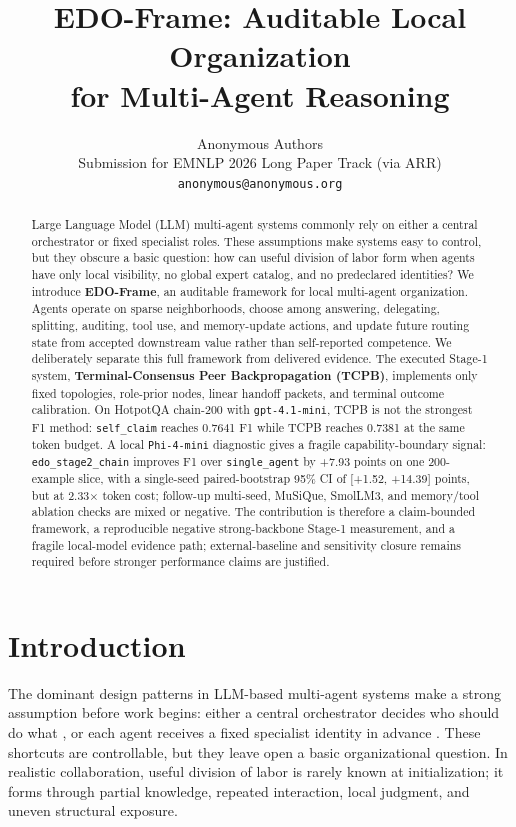 \documentclass[11pt]{article}
\title{EDO-Frame: Auditable Local Organization \\
for Multi-Agent Reasoning}
\author{Anonymous Authors \\
  Submission for EMNLP 2026 Long Paper Track (via ARR) \\
  \texttt{anonymous@anonymous.org}}
\begin{document}
\maketitle
\sloppy

\begin{abstract}
Large Language Model (LLM) multi-agent systems commonly rely on either a central orchestrator or fixed specialist roles. These assumptions make systems easy to control, but they obscure a basic question: how can useful division of labor form when agents have only local visibility, no global expert catalog, and no predeclared identities? We introduce \textbf{EDO-Frame}, an auditable framework for local multi-agent organization. Agents operate on sparse neighborhoods, choose among answering, delegating, splitting, auditing, tool use, and memory-update actions, and update future routing state from accepted downstream value rather than self-reported competence. We deliberately separate this full framework from delivered evidence. The executed Stage-1 system, \textbf{Terminal-Consensus Peer Backpropagation (TCPB)}, implements only fixed topologies, role-prior nodes, linear handoff packets, and terminal outcome calibration. On HotpotQA chain-200 with \texttt{gpt-4.1-mini}, TCPB is not the strongest F1 method: \texttt{self\_claim} reaches 0.7641 F1 while TCPB reaches 0.7381 at the same token budget. A local \texttt{Phi-4-mini} diagnostic gives a fragile capability-boundary signal: \texttt{edo\_stage2\_chain} improves F1 over \texttt{single\_agent} by +7.93 points on one 200-example slice, with a single-seed paired-bootstrap 95\% CI of [+1.52, +14.39] points, but at 2.33$\times$ token cost; follow-up multi-seed, MuSiQue, SmolLM3, and memory/tool ablation checks are mixed or negative. The contribution is therefore a claim-bounded framework, a reproducible negative strong-backbone Stage-1 measurement, and a fragile local-model evidence path; external-baseline and sensitivity closure remains required before stronger performance claims are justified.
\end{abstract}

\section{Introduction}

The dominant design patterns in LLM-based multi-agent systems make a strong assumption before work begins: either a central orchestrator decides who should do what \citep{wu2023autogen,hong2024metagpt,shen2023hugginggpt}, or each agent receives a fixed specialist identity in advance \citep{qian2024chatdev,chen2024agentverse}. These shortcuts are controllable, but they leave open a basic organizational question. In realistic collaboration, useful division of labor is rarely known at initialization; it forms through partial knowledge, repeated interaction, local judgment, and uneven structural exposure.
\end{document}
